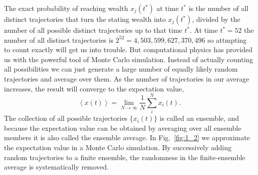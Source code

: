 \documentclass[a4paper]{article}
\newcommand{\ave}[1]{\left\langle#1 \right\rangle}
\newcommand{\elabel}[1]{\label{eq:#1}}
\newcommand{\fref}[1]{Fig.~\ref{fig:#1}}
\newcommand{\be}{\begin{equation}}
\newcommand{\ee}{\end{equation}}
\begin{document}
The exact probability of reaching wealth $x_j(t^*)$ at time $t^*$ is 
the number of all distinct trajectories that turn the stating wealth into $x_j(t^*)$, divided by the 
number of all possible distinct trajectories up to that time $t^*$. At time $t^*=52$ the 
number of all distinct trajectories is $2^{52}=4,503,599,627,370,496$ so attmpting to 
count exactly will get us into trouble. But computational physics has provided us with the 
powerful tool of Monte Carlo simulation. Instead of actually counting all possibilities we 
can just generate a large number of equally likely random trajectories and average 
over them. As the number of trajectories in our average increases, the result
will converge to the expectation value,
\be
\ave{x(t)}=\lim_{N\to\infty} \frac{1}{N}\sum_i^N x_i(t).
\elabel{ave_x}
\ee
The collection of all possible trajectories $\{x_i(t)\}$ is called 
an ensemble, and because the expectation value can be 
obtained by averaging over all ensemble members it is also 
called the ensemble average. In \fref{1_2} we approximate 
the expectation value in a Monte Carlo simulation. By 
successively adding random trajectories to a finite ensemble, 
the randomness in the finite-ensemble average is 
systematically removed.
\end{document}
